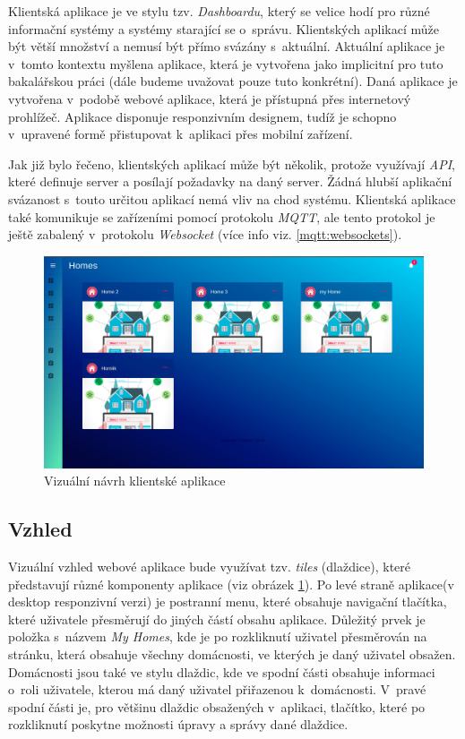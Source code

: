 Klientská aplikace je ve stylu tzv. \emph{Dashboardu}, který se velice hodí pro různé informační systémy a systémy starající se o~správu.
Klientských aplikací může být větší množství a nemusí být přímo svázány s~aktuální.
Aktuální aplikace je v~tomto kontextu myšlena aplikace, která je vytvořena jako implicitní pro tuto bakalářskou práci (dále budeme uvažovat pouze tuto konkrétní).
Daná aplikace je vytvořena v~podobě webové aplikace, která je přístupná přes internetový prohlížeč.
Aplikace disponuje responzivním designem, tudíž je schopno v~upravené formě přistupovat k~aplikaci přes mobilní zařízení.

Jak již bylo řečeno, klientských aplikací může být několik, protože využívají \emph{API}, které definuje server a posílají požadavky na daný server.
Žádná hlubší aplikační svázanost s~touto určitou aplikací nemá vliv na chod systému.
Klientská aplikace také komunikuje se zařízeními pomocí protokolu \emph{MQTT}, ale tento protokol je ještě zabalený v~protokolu \emph{Websocket} (více info viz. \ref{mqtt:websockets}).

\begin{figure}[hbt]
  \centering
  \includegraphics[width=0.9 \linewidth]{obrazky-figures/mockup.png}
  \caption{Vizuální návrh klientské aplikace}
  \label{figure:design}
\end{figure}

\newpage
\subsection*{Vzhled}
\label{frontend:vzhled}
Vizuální vzhled webové aplikace bude využívat tzv. \emph{tiles} (dlaždice), které představují různé komponenty aplikace (viz obrázek \ref{figure:design}).
Po levé straně aplikace(v desktop responzivní verzi) je postranní menu, které obsahuje navigační tlačítka, které uživatele přesměrují do jiných částí obsahu aplikace.
Důležitý prvek je položka s~názvem \emph{My Homes}, kde je po rozkliknutí uživatel přesměrován na stránku, která obsahuje všechny domácnosti, ve kterých je daný uživatel obsažen.
Domácnosti jsou také ve stylu dlaždic, kde ve spodní části obsahuje informaci o~roli uživatele, kterou má daný uživatel přiřazenou k~domácnosti.
V~pravé spodní části je, pro většinu dlaždic obsažených v~aplikaci, tlačítko, které po rozkliknutí poskytne možnosti úpravy a správy dané dlaždice.

